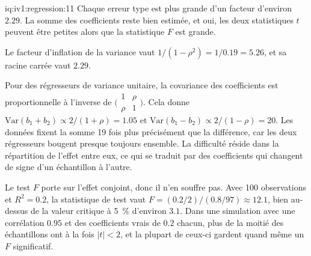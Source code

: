 \begin{solution}{iq:iv1:regression:11}
Chaque erreur type est plus grande d'un facteur d'environ $2.29$. La somme des coefficients reste bien estimée, et oui, les deux statistiques $t$ peuvent être petites alors que la statistique $F$ est grande.

Le facteur d'inflation de la variance vaut $1/(1 - \rho^2) = 1/0.19 = 5.26$, et sa racine carrée vaut $2.29$.

Pour des régresseurs de variance unitaire, la covariance des coefficients est proportionnelle à l'inverse de $\bigl(\begin{smallmatrix}1 & \rho\\ \rho & 1\end{smallmatrix}\bigr)$. Cela donne $\mathrm{Var}(b_1 + b_2) \propto 2/(1 + \rho) = 1.05$ et $\mathrm{Var}(b_1 - b_2) \propto 2/(1 - \rho) = 20$. Les données fixent la somme 19 fois plus précisément que la différence, car les deux régresseurs bougent presque toujours ensemble. La difficulté réside dans la répartition de l'effet entre eux, ce qui se traduit par des coefficients qui changent de signe d'un échantillon à l'autre.

Le test $F$ porte sur l'effet conjoint, donc il n'en souffre pas. Avec 100 observations et $R^2 = 0.2$, la statistique de test vaut $F = (0.2/2)/(0.8/97) \approx 12.1$, bien au-dessus de la valeur critique à 5~\% d'environ $3.1$. Dans une simulation avec une corrélation $0.95$ et des coefficients vrais de $0.2$ chacun, plus de la moitié des échantillons ont à la fois $|t| < 2$, et la plupart de ceux-ci gardent quand même un $F$ significatif.

\end{solution}

